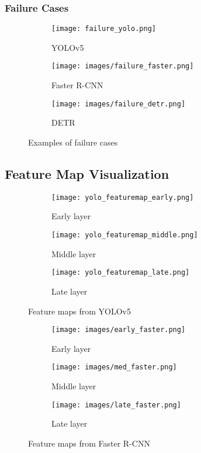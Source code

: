 \documentclass[12pt,a4paper]{article}
\begin{document}
\subsubsection{Failure Cases}

\begin{figure}[H]
    \centering
    \begin{subfigure}[b]{0.3\textwidth}
        \texttt{[image: failure\_yolo.png]}
        \caption{YOLOv5}
    \end{subfigure}
    \hfill
    \begin{subfigure}[b]{0.3\textwidth}
        \texttt{[image: images/failure\_faster.png]}
        \caption{Faster R-CNN}
    \end{subfigure}
    \hfill
    \begin{subfigure}[b]{0.3\textwidth}
        \texttt{[image: images/failure\_detr.png]}
        \caption{DETR}
    \end{subfigure}
    \caption{Examples of failure cases}
    \label{fig:failure_cases}
\end{figure}

\subsection{Feature Map Visualization}

\begin{figure}[H]
    \centering
    \begin{subfigure}[b]{0.3\textwidth}
        \texttt{[image: yolo\_featuremap\_early.png]}
        \caption{Early layer}
    \end{subfigure}
    \hfill
    \begin{subfigure}[b]{0.3\textwidth}
        \texttt{[image: yolo\_featuremap\_middle.png]}
        \caption{Middle layer}
    \end{subfigure}
    \hfill
    \begin{subfigure}[b]{0.3\textwidth}
        \texttt{[image: yolo\_featuremap\_late.png]}
        \caption{Late layer}
    \end{subfigure}
    \caption{Feature maps from YOLOv5}
    \label{fig:yolo_featuremaps}
\end{figure}

\begin{figure}[H]
    \centering
    \begin{subfigure}[b]{0.3\textwidth}
        \texttt{[image: images/early\_faster.png]}
        \caption{Early layer}
    \end{subfigure}
    \hfill
    \begin{subfigure}[b]{0.3\textwidth}
        \texttt{[image: images/med\_faster.png]}
        \caption{Middle layer}
    \end{subfigure}
    \hfill
    \begin{subfigure}[b]{0.3\textwidth}
        \texttt{[image: images/late\_faster.png]}
        \caption{Late layer}
    \end{subfigure}
    \caption{Feature maps from Faster R-CNN}
    \label{fig:faster_featuremaps}
\end{figure}
\end{document}
